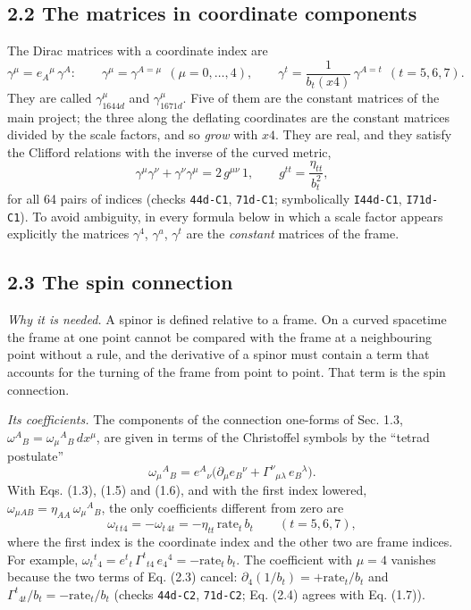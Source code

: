 \documentclass[
  10pt,
]{article}
\begin{document}
\hypertarget{the-matrices-in-coordinate-components}{%
\subsection{2.2 The matrices in coordinate
components}\label{the-matrices-in-coordinate-components}}

The Dirac matrices with a coordinate index are
\[\gamma^\mu=e_A{}^\mu\,\gamma^A:\qquad
\gamma^\mu=\gamma^{A=\mu}\ \ (\mu=0,\dots,4),\qquad
\gamma^t=\frac{1}{b_t(x4)}\,\gamma^{A=t}\ \ (t=5,6,7).\tag{2.1}\] They
are called \(\gamma_{1644d}^\mu\) and \(\gamma_{1671d}^\mu\). Five of
them are the constant matrices of the main project; the three along the
deflating coordinates are the constant matrices divided by the scale
factors, and so \emph{grow} with \(x4\). They are real, and they satisfy
the Clifford relations with the inverse of the curved metric,
\[\gamma^\mu\gamma^\nu+\gamma^\nu\gamma^\mu=2\,g^{\mu\nu}\,1,\qquad g^{tt}=\frac{\eta_{tt}}{b_t^2},\tag{2.2}\]
for all 64 pairs of indices (checks \texttt{44d-C1}, \texttt{71d-C1};
symbolically \texttt{I44d-C1}, \texttt{I71d-C1}). To avoid ambiguity, in
every formula below in which a scale factor appears explicitly the
matrices \(\gamma^4\), \(\gamma^a\), \(\gamma^t\) are the
\emph{constant} matrices of the frame.

\hypertarget{the-spin-connection}{%
\subsection{2.3 The spin connection}\label{the-spin-connection}}

\emph{Why it is needed.} A spinor is defined relative to a frame. On a
curved spacetime the frame at one point cannot be compared with the
frame at a neighbouring point without a rule, and the derivative of a
spinor must contain a term that accounts for the turning of the frame
from point to point. That term is the spin connection.

\emph{Its coefficients.} The components of the connection one-forms of
Sec. 1.3, \(\omega^A{}_B=\omega_\mu{}^A{}_B\,dx^\mu\), are given in
terms of the Christoffel symbols by the ``tetrad postulate''
\[\omega_\mu{}^A{}_B=e^A{}_\nu\big(\partial_\mu e_B{}^\nu+\Gamma^\nu{}_{\mu\lambda}\,e_B{}^\lambda\big).\tag{2.3}\]
With Eqs. (1.3), (1.5) and (1.6), and with the first index lowered,
\(\omega_{\mu AB}=\eta_{AA}\,\omega_\mu{}^A{}_B\), the only coefficients
different from zero are
\[\omega_{t\,t4}=-\omega_{t\,4t}=-\eta_{tt}\,\mathrm{rate}_t\,b_t\qquad(t=5,6,7),\tag{2.4}\]
where the first index is the coordinate index and the other two are
frame indices. For example,
\(\omega_t{}^t{}_4=e^t{}_t\,\Gamma^t{}_{t4}\,e_4{}^4=-\mathrm{rate}_t\,b_t\).
The coefficient with \(\mu=4\) vanishes because the two terms of Eq.
(2.3) cancel: \(\partial_4(1/b_t)=+\mathrm{rate}_t/b_t\) and
\(\Gamma^t{}_{4t}/b_t=-\mathrm{rate}_t/b_t\) (checks \texttt{44d-C2},
\texttt{71d-C2}; Eq. (2.4) agrees with Eq. (1.7)).
\end{document}

